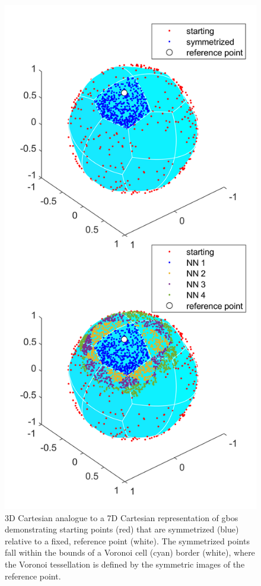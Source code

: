 \documentclass[preprint,12pt]{elsarticle}
\begin{document}
\begin{figure}
    \centering
    \includegraphics{voronoi.png}
    \caption{3D Cartesian analogue to a 7D Cartesian representation of \glspl{gbo} demonstrating starting points (red) that are symmetrized (blue) relative to a fixed, reference point (white). The symmetrized points fall within the bounds of a Voronoi cell (cyan) border (white), where the Voronoi tessellation is defined by the symmetric images of the reference point.}
    \label{fig:voronoi}
\end{figure}
\end{document}
